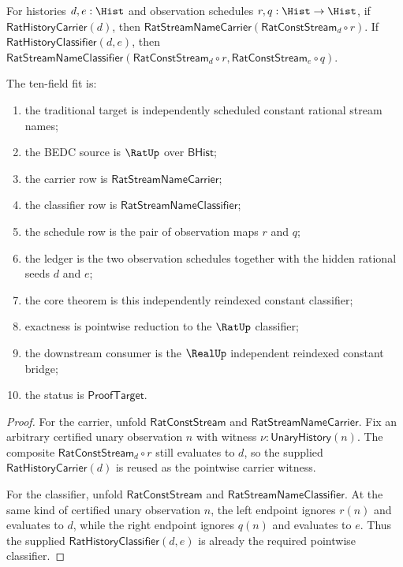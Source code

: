 \begin{theorem}
\label{thm:rat-stream-name-independent-reindexed-constant-classifier}
For histories $d,e:\Hist$ and observation schedules
$r,q:\Hist\to\Hist$, if $\mathsf{RatHistoryCarrier}(d)$, then
$\mathsf{RatStreamNameCarrier}(\mathsf{RatConstStream}_d\circ r)$. If
$\mathsf{RatHistoryClassifier}(d,e)$, then
$\mathsf{RatStreamNameClassifier}(\mathsf{RatConstStream}_d\circ r,
\mathsf{RatConstStream}_e\circ q)$.

The ten-field fit is:
\begin{enumerate}
  \item the traditional target is independently scheduled constant rational
  stream names;
  \item the BEDC source is $\RatUp$ over $\mathsf{BHist}$;
  \item the carrier row is $\mathsf{RatStreamNameCarrier}$;
  \item the classifier row is $\mathsf{RatStreamNameClassifier}$;
  \item the schedule row is the pair of observation maps $r$ and $q$;
  \item the ledger is the two observation schedules together with the hidden
  rational seeds $d$ and $e$;
  \item the core theorem is this independently reindexed constant classifier;
  \item exactness is pointwise reduction to the $\RatUp$ classifier;
  \item the downstream consumer is the $\RealUp$ independent reindexed constant
  bridge;
  \item the status is $\mathsf{ProofTarget}$.
\end{enumerate}
\end{theorem}
\begin{proof}
For the carrier, unfold $\mathsf{RatConstStream}$ and
$\mathsf{RatStreamNameCarrier}$. Fix an arbitrary certified unary observation
$n$ with witness $\nu:\mathsf{UnaryHistory}(n)$. The composite
$\mathsf{RatConstStream}_d\circ r$ still evaluates to $d$, so the supplied
$\mathsf{RatHistoryCarrier}(d)$ is reused as the pointwise carrier witness.

For the classifier, unfold $\mathsf{RatConstStream}$ and
$\mathsf{RatStreamNameClassifier}$. At the same kind of certified unary
observation $n$, the left endpoint ignores $r(n)$ and evaluates to $d$, while
the right endpoint ignores $q(n)$ and evaluates to $e$. Thus the supplied
$\mathsf{RatHistoryClassifier}(d,e)$ is already the required pointwise
classifier.
\end{proof}

